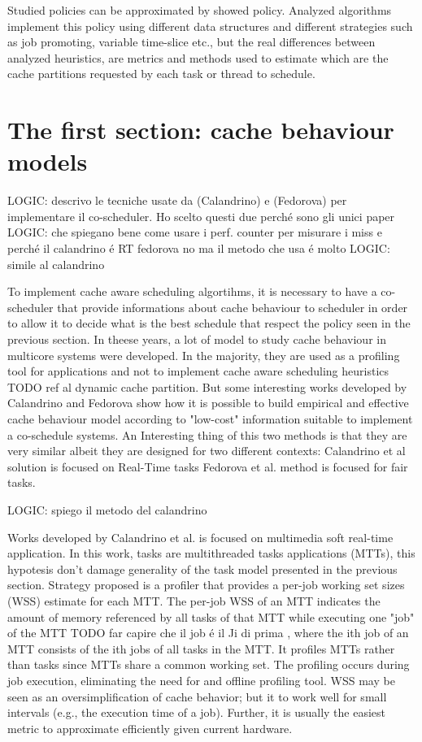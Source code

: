 \documentclass[a4paper,10pt]{article}
\begin{document}
\begin{multicols}{2}
Studied policies can be approximated by showed policy. Analyzed algorithms implement this policy using different data structures and different
strategies such as job promoting, variable time-slice etc., but the real differences between analyzed heuristics, are metrics and methods used to 
estimate which are the cache partitions requested by each task or thread to schedule.


\section{The first section: cache behaviour models}

LOGIC: descrivo le tecniche usate da (Calandrino) e (Fedorova) per implementare il co-scheduler. Ho scelto questi due perch\'e sono gli unici paper
LOGIC: che spiegano bene come usare i perf. counter per misurare i miss e perch\'e il calandrino \'e RT fedorova no ma il metodo che usa \'e molto
LOGIC: simile al calandrino

To implement cache aware scheduling algortihms, it is necessary to have a co-scheduler that provide informations about cache behaviour
to scheduler in order to allow it to decide what is the best schedule that respect the policy seen in the previous section.
In theese years, a lot of model to study cache behaviour in multicore systems were developed. In the majority, they are used as a profiling tool for
applications and not to implement cache aware scheduling heuristics TODO ref al dynamic cache partition. 
But some interesting works developed by Calandrino and Fedorova show how it is possible to build empirical and effective cache behaviour model 
according to "low-cost" information suitable to implement a co-schedule systems. An Interesting thing of this two methods is that they are very 
similar albeit they are designed for two different contexts: Calandrino et al solution is focused on Real-Time tasks Fedorova et al. method is focused 
for fair tasks.

LOGIC: spiego il metodo del calandrino

Works developed by Calandrino et al. is focused on multimedia soft real-time application. In this work, tasks are multithreaded tasks applications (MTTs),
this hypotesis don't damage generality of the task model presented in the previous section.
Strategy proposed is a profiler that provides a per-job working set sizes (WSS) estimate for each MTT. The per-job WSS of an MTT indicates the amount 
of memory referenced by all tasks of that MTT while executing one "job" of the MTT TODO far capire che il job \'e il Ji di prima , where the ith job of 
an MTT consists of the ith jobs of all  tasks in the MTT. It profiles MTTs rather than tasks since MTTs share a common working set. The profiling 
occurs during job execution, eliminating the need for and offline profiling tool. WSS may be seen as an oversimplification of cache behavior; but 
it to work well for small intervals (e.g., the execution time of a job). Further, it is usually the easiest metric to approximate efficiently 
given current hardware.


\end{multicols}
\end{document}

